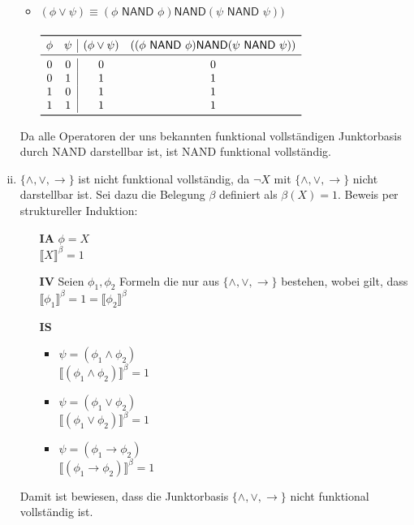 \documentclass[a4paper,10pt]{article}
\begin{document}
\begin{enumerate}[(i)]
\begin{itemize}
\begin{math}
\end{math}
\\
\item $(\phi \lor \psi) \equiv (\phi \textsf{ NAND } \phi) \textsf{NAND} (\psi \textsf{ NAND } \psi))$\\
\\
\begin{math}
\begin{array}{cc|cc}
\toprule 
\phi & \psi & (\phi \lor  \psi) & ((\phi \textsf{ NAND } \phi) \textsf{NAND} (\psi \textsf{ NAND } \psi)) \\
\midrule
0 & 0 & 0 & 0 \\
0 & 1 & 1 & 1 \\
1 & 0 & 1 & 1 \\
1 & 1 & 1 & 1 \\
\bottomrule
\end{array}
\end{math}
\end{itemize}
Da alle Operatoren der uns bekannten funktional vollständigen Junktorbasis durch \textsf{NAND} darstellbar ist, ist \textsf{NAND} funktional vollständig.
\item $\{\land, \lor, \rightarrow \}$ ist nicht funktional vollständig, da $\lnot X$ mit $\{\land, \lor, \rightarrow \}$  nicht darstellbar ist. Sei dazu die Belegung $\beta$ definiert als $\beta(X) = 1$.
Beweis per struktureller Induktion:
\begin{itemize}
\item[\textbf{IA}] $\phi = X$ \\
$\llbracket X \rrbracket^{\beta} = 1$
\item[\textbf{IV}] Seien $\phi_1, \phi_2$ Formeln die nur aus   $\{\land, \lor, \rightarrow \}$ bestehen, wobei gilt, dass $\llbracket \phi_1 \rrbracket^{\beta} = 1 = \llbracket \phi_2 \rrbracket^{\beta} $
\item[\textbf{IS}] 
\begin{itemize}
\item $\psi = (\phi_1 \land \phi_2)$ \\
$\llbracket  (\phi_1 \land \phi_2) \rrbracket^\beta = 1$
\item $\psi = (\phi_1 \lor \phi_2)$ \\
$\llbracket  (\phi_1 \lor\phi_2) \rrbracket^\beta = 1$
\item $\psi = (\phi_1 \rightarrow \phi_2)$ \\
$\llbracket  (\phi_1 \rightarrow \phi_2) \rrbracket^\beta = 1$
\end{itemize}
\end{itemize}
Damit ist bewiesen, dass die Junktorbasis $\{\land, \lor, \rightarrow \}$ nicht funktional vollständig ist.
\end{enumerate}
\end{document}
